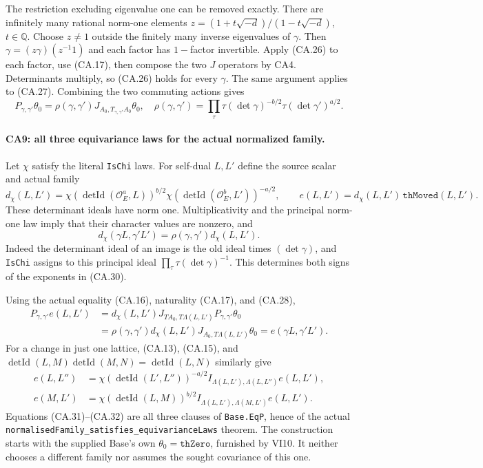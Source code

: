 The restriction excluding eigenvalue one can be removed exactly.
There are infinitely many rational norm-one elements
$z=(1+t\sqrt{-d})/(1-t\sqrt{-d})$, $t\in\mathbb Q$.
Choose $z\ne1$ outside the finitely many inverse eigenvalues of
$\gamma$. Then $\gamma=(z\gamma)(z^{-1}1)$ and each factor has
$1-$factor invertible. Apply (CA.26) to each factor, use
(CA.17), then compose the two $J$ operators by CA4. Determinants
multiply, so (CA.26) holds for every $\gamma$. The same argument
applies to (CA.27). Combining the two commuting actions gives
\[
 P_{\gamma,\gamma'}\theta_0
    =\rho(\gamma,\gamma')J_{A_0,T_{\gamma,\gamma'}A_0}\theta_0,
 \quad
 \rho(\gamma,\gamma')=
       \prod_\tau\tau(\det\gamma)^{-b/2}
                       \tau(\det\gamma')^{a/2}.
 \tag{CA.28}
\]

\paragraph{CA9: all three equivariance laws for the actual normalized family.}
Let $\chi$ satisfy the literal \texttt{IsChi} laws. For self-dual
$L,L'$ define the source scalar and actual family
\[
 d_\chi(L,L')=
  \chi(\operatorname{detId}(\mathcal O_E^a,L))^{b/2}
  \chi(\operatorname{detId}(\mathcal O_E^b,L'))^{-a/2},\qquad
 e(L,L')=d_\chi(L,L')\,\texttt{thMoved}(L,L').
 \tag{CA.29}
\]
These determinant ideals have norm one. Multiplicativity and the
principal norm-one law imply that their character values are
nonzero, and
\[
 d_\chi(\gamma L,\gamma'L')=
       \rho(\gamma,\gamma')d_\chi(L,L').
 \tag{CA.30}
\]
Indeed the determinant ideal of an image is the old ideal times
$(\det\gamma)$, and \texttt{IsChi} assigns to this principal ideal
$\prod_\tau\tau(\det\gamma)^{-1}$. This determines both signs of
the exponents in (CA.30).

Using the actual equality (CA.16), naturality (CA.17), and (CA.28),
\[
\begin{split}
 P_{\gamma,\gamma'}e(L,L')
  &=d_\chi(L,L')J_{TA_0,T\Lambda(L,L')}
                        P_{\gamma,\gamma'}\theta_0\\
  &=\rho(\gamma,\gamma')d_\chi(L,L')
                        J_{A_0,T\Lambda(L,L')}\theta_0
   =e(\gamma L,\gamma'L').
\end{split}
 \tag{CA.31}
\]
For a change in just one lattice, (CA.13), (CA.15), and
$\operatorname{detId}(L,M)\operatorname{detId}(M,N)=\operatorname{detId}(L,N)$ similarly give
\[
\begin{split}
 e(L,L'')&=\chi(\operatorname{detId}(L',L''))^{-a/2}
            I_{\Lambda(L,L'),\Lambda(L,L'')}e(L,L'),\\
 e(M,L')&=\chi(\operatorname{detId}(L,M))^{b/2}
            I_{\Lambda(L,L'),\Lambda(M,L')}e(L,L').
\end{split}
 \tag{CA.32}
\]
Equations (CA.31)--(CA.32) are all three clauses of
\texttt{Base.EqP}, hence of the actual
\texttt{normalisedFamily\_satisfies\_equivarianceLaws} theorem.
The construction starts with the supplied Base's own
$\theta_0=\texttt{thZero}$, furnished by VI10. It neither chooses
a different family nor assumes the sought covariance of this one.

